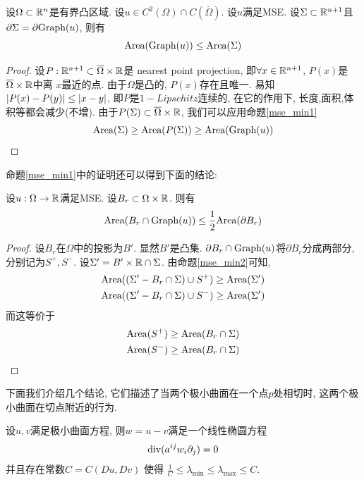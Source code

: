 \begin{proposition}\label{mse_min2}
    设$\Omega \subset {\mathbb{R}}^n$是有界凸区域. 设$u \in C^2(\Omega) \cap C(\overline{\Omega})$. 设$u$满足MSE. 设$\Sigma\subset {\mathbb{R}}^{n+1}$且$\partial \Sigma = \partial \text{Graph}(u)$, 则有
    \begin{equation}
        \text{Area}(\text{Graph}(u)) \le \text{Area}(\Sigma)
    \end{equation}
\end{proposition}
\begin{proof}
    设$P:{\mathbb{R}}^{n+1} \subset \overline{\Omega} \times {\mathbb{R}}$是 nearest point projection, 即$\forall x \in {\mathbb{R}}^{n+1}$, $P(x)$是$\overline{\Omega}\times {\mathbb{R}}$中离 $x$最近的点. 由于$\Omega$是凸的, $P(x)$存在且唯一. 易知${\left | P(x)-P(y) \right |} \le {\left | x-y \right |}$, 即$P$是$1-Lipschitz$连续的, 在它的作用下, 长度,面积,体积等都会减少(不增). 由于$P(\Sigma) \subset \overline{\Omega} \times {\mathbb{R}}$, 我们可以应用命题\eqref{mse_min1}
    \begin{equation}
        \text{Area}(\Sigma) \ge \text{Area}(P(\Sigma)) \ge \text{Area}(\text{Graph}(u))
    \end{equation}
\end{proof}
命题\eqref{mse_min1}中的证明还可以得到下面的结论:
\begin{corollary}
    设$u: \Omega \to {\mathbb{R}}$满足MSE. 设$B_r \subset \Omega \times {\mathbb{R}}$. 则有
    \begin{equation}
        \text{Area}(B_r \cap \text{Graph}(u)) \le \frac{1}{2} \text{Area}(\partial B_r)
    \end{equation}
\end{corollary}
\begin{proof}
    设$B_r$在$\Omega$中的投影为$B'$. 显然$B'$是凸集. $\partial B_r \cap \text{Graph}(u)$将$\partial B_r$分成两部分, 分别记为$S^+, S^-$. 设$\Sigma'= B'\times {\mathbb{R}} \cap \Sigma$. 由命题\eqref{mse_min2}可知, 
    \begin{align}
        &\text{Area}((\Sigma'-B_r \cap \Sigma) \cup S^+) \ge \text{Area}(\Sigma') \\
        &\text{Area}((\Sigma'-B_r \cap \Sigma) \cup S^-) \ge \text{Area}(\Sigma')
    \end{align}
    而这等价于
    \begin{align}
        &\text{Area}(S^+) \ge \text{Area}(B_r \cap \Sigma)  \\
        &\text{Area}(S^-) \ge \text{Area}(B_r \cap \Sigma) 
    \end{align}
\end{proof}
下面我们介绍几个结论,  它们描述了当两个极小曲面在一个点$p$处相切时, 这两个极小曲面在切点附近的行为.
\begin{proposition}
    设$u,v$满足极小曲面方程, 则$w=u-v$满足一个线性椭圆方程
    \begin{equation}
        {\text{div}}(a^{ij}w_i{\partial_j}) =0
    \end{equation}
    并且存在常数$C=C(Du,Dv)$ 使得 $\frac{1}{C} \le \lambda_{\min} \le \lambda_{\max} \le C$.
\end{proposition}
